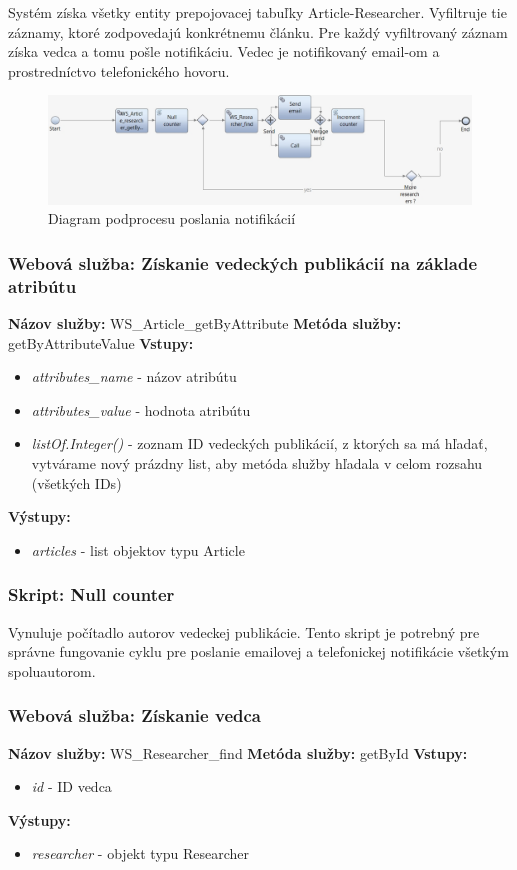 \documentclass[10pt,oneside,slovak,a4paper]{article}
\begin{document}
Systém získa všetky entity prepojovacej tabuľky Article-Researcher. Vyfiltruje tie záznamy, ktoré zodpovedajú konkrétnemu článku. Pre každý vyfiltrovaný záznam získa vedca a tomu pošle notifikáciu. Vedec je notifikovaný email-om a prostredníctvo telefonického hovoru.

\begin{figure} [H]
\centering
\includegraphics[scale=0.4]{diagrams/diagNotification.jpg} 
\caption{Diagram podprocesu poslania notifikácií}
\end{figure}

\subsubsection{Webová služba: Získanie vedeckých publikácií na základe atribútu}
\textbf{Názov služby:} WS\_Article\_getByAttribute
\textbf{Metóda služby:} getByAttributeValue
\textbf{Vstupy:}
	\begin{itemize}
		\item \textit{attributes\_name} - názov atribútu
		\item \textit{attributes\_value} - hodnota atribútu
		\item \textit{listOf.Integer()} - zoznam ID vedeckých publikácií, z ktorých sa má hľadať, vytvárame nový prázdny list, aby metóda služby hľadala v celom rozsahu (všetkých IDs)
	\end{itemize}
\textbf{Výstupy:}
	\begin{itemize}
		\item \textit{articles} - list objektov typu Article
	\end{itemize}

\subsubsection{Skript: Null counter}
Vynuluje počítadlo autorov vedeckej publikácie. Tento skript je potrebný pre správne fungovanie cyklu pre poslanie emailovej a telefonickej notifikácie všetkým spoluautorom.

\subsubsection{Webová služba: Získanie vedca}
\textbf{Názov služby:} WS\_Researcher\_find
\textbf{Metóda služby:} getById
\textbf{Vstupy:}
	\begin{itemize}
		\item \textit{id} - ID vedca
	\end{itemize}
\textbf{Výstupy:}
	\begin{itemize}
		\item \textit{researcher} - objekt typu Researcher
	\end{itemize}
\end{document}
